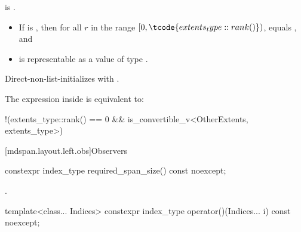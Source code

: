 \begin{itemdescr}
\pnum
\constraints
{} is .

\pnum
\expects
\begin{itemize}
\item
If  is ,
then for all $r$ in the range $[0, \tcode{extents_type::rank()})$,
 equals
, and
\item
{} is representable as
a value of type .
\end{itemize}

\pnum
\effects
Direct-non-list-initializes  with .

\pnum
\remarks
The expression inside  is equivalent to:
\begin{codeblock}
!(extents_type::rank() == 0 && is_convertible_v<OtherExtents, extents_type>)
\end{codeblock}
\end{itemdescr}

[mdspan.layout.left.obs]{Observers}

%
\begin{itemdecl}
constexpr index_type required_span_size() const noexcept;
\end{itemdecl}

\begin{itemdescr}
\pnum
\returns
{}.
\end{itemdescr}

%
\begin{itemdecl}
template<class... Indices>
  constexpr index_type operator()(Indices... i) const noexcept;
\end{itemdecl}

